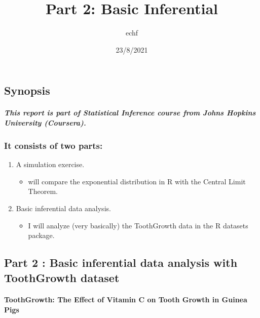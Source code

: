 \documentclass[
]{article}
\title{Part 2: Basic Inferential}
\author{echf}
\date{23/8/2021}
\providecommand{\tightlist}{%
  \setlength{\itemsep}{0pt}\setlength{\parskip}{0pt}}
\begin{document}
\maketitle

\hypertarget{synopsis}{%
\subsection{Synopsis}\label{synopsis}}

\hypertarget{this-report-is-part-of-statistical-inference-course-from-johns-hopkins-university-coursera.}{%
\subparagraph{This report is part of Statistical Inference course from
Johns Hopkins University
(Coursera).}\label{this-report-is-part-of-statistical-inference-course-from-johns-hopkins-university-coursera.}}

\hypertarget{it-consists-of-two-parts}{%
\subsubsection{It consists of two
parts:}\label{it-consists-of-two-parts}}

\begin{enumerate}
\def\labelenumi{\arabic{enumi}.}
\tightlist
\item
  A simulation exercise.

  \begin{itemize}
  \tightlist
  \item
    will compare the exponential distribution in R with the Central
    Limit Theorem.
  \end{itemize}
\item
  Basic inferential data analysis.

  \begin{itemize}
  \tightlist
  \item
    I will analyze (very basically) the ToothGrowth data in the R
    datasets package.
  \end{itemize}
\end{enumerate}

\hypertarget{part-2-basic-inferential-data-analysis-with-toothgrowth-dataset}{%
\subsection{Part 2 : Basic inferential data analysis with ToothGrowth
dataset}\label{part-2-basic-inferential-data-analysis-with-toothgrowth-dataset}}

\hypertarget{toothgrowth-the-effect-of-vitamin-c-on-tooth-growth-in-guinea-pigs}{%
\paragraph{ToothGrowth: The Effect of Vitamin C on Tooth Growth in
Guinea
Pigs}\label{toothgrowth-the-effect-of-vitamin-c-on-tooth-growth-in-guinea-pigs}}
\end{document}
